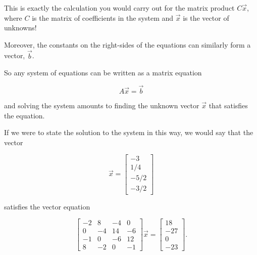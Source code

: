 \documentclass{ximera}
\begin{document}
\begin{example}
\begin{remark}
This is exactly the calculation you would carry out for the matrix product $C\vec{x}$, where $C$ is the matrix of coefficients in the system and $\vec{x}$ is the vector of unknowns!

Moreover, the constants on the right-sides of the equations can similarly form a vector, $\vec{b}$. 

So any system of equations can be written as a matrix equation

$$A\vec{x} = \vec{b}$$

and solving the system amounts to finding the unknown vector $\vec{x}$ that satisfies the equation.

If we were to state the solution to the system in this way, we would say that the vector

$$\vec{x} = \begin{bmatrix}-3 \\ 1/4\\-5/2\\-3/2\end{bmatrix}$$

satisfies the vector equation 

$$\begin{bmatrix}-2 & 8 & -4 & 0 \\ 0 & -4 & 14 & -6 \\ -1 & 0 & -6 & 12 \\ 8 & -2 & 0 & -1\end{bmatrix}\vec{x} = \begin{bmatrix}18 \\ -27\\0\\-23\end{bmatrix}.$$


\end{remark}

\end{example}
\end{document}
